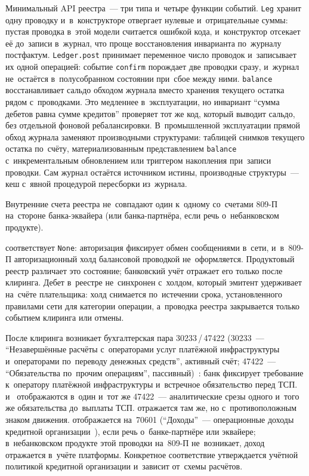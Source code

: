 Минимальный API реестра~--- три типа и~четыре функции событий. \texttt{Leg}
хранит одну проводку и~в~конструкторе отвергает нулевые и~отрицательные
суммы: пустая проводка в~этой модели считается ошибкой кода, и~конструктор отсекает
её до~записи в~журнал, что проще восстановления инварианта по~журналу
постфактум. \texttt{Ledger.post} принимает переменное число проводок и~записывает их
одной операцией: событие \texttt{confirm} порождает две проводки сразу,
и~журнал не~остаётся в~полусобранном состоянии при~сбое между ними.
\texttt{balance} восстанавливает сальдо обходом журнала вместо хранения
текущего остатка рядом с~проводками. Это медленнее в~эксплуатации, но инвариант
\enquote{сумма дебетов равна сумме кредитов} проверяет тот же код, который
выводит сальдо, без отдельной фоновой ребалансировки. В~промышленной эксплуатации прямой
обход журнала заменяют производными структурами: таблицей снимков текущего
остатка по~счёту, материализованным представлением \texttt{balance}
с~инкрементальным обновлением или триггером накопления при~записи проводки. Сам
журнал остаётся источником истины, производные структуры~--- кеш с~явной
процедурой пересборки из~журнала.


Внутренние счета реестра не~совпадают один к~одному со~счетами 809-П на~стороне
банка-эквайера (или банка-партнёра, если речь о~небанковском продукте).

 соответствует \texttt{None}: авторизация фиксирует
обмен сообщениями в~сети, и~в~809-П
авторизационный холд балансовой проводкой не~оформляется. Продуктовый реестр
различает это состояние; банковский учёт отражает его только после клиринга.
Дебет  в~реестре не~синхронен с~холдом, который
эмитент удерживает на~счёте плательщика: холд снимается по~истечении срока,
установленного правилами сети для категории
операции, а~проводка реестра
закрывается только событием клиринга или отмены.

После клиринга возникает бухгалтерская пара 30233\,/\,47422 (30233~---
  \enquote{Незавершённые расчёты с~операторами услуг платёжной инфраструктуры
  и~операторами по~переводу денежных средств}, активный счёт; 47422~---
\enquote{Обязательства по~прочим операциям}, пассивный)~\cite{cbr-809p}: банк
фиксирует требование к~оператору платёжной инфраструктуры и~встречное
обязательство перед ТСП. 
и~ отображаются в~один и~тот же 47422~---
аналитические срезы одного и~того же обязательства до~выплаты ТСП.
 отражается там же, но с~противоположным знаком движения.
 отображается на~70601 (\enquote{Доходы}~---
операционные доходы кредитной организации~\cite{cbr-809p}), если речь
о~банке-партнёре или эквайере; в~небанковском продукте этой проводки на~809-П
не~возникает, доход отражается в~учёте платформы. Конкретное соответствие
утверждается учётной политикой кредитной организации и~зависит от~схемы
расчётов.

